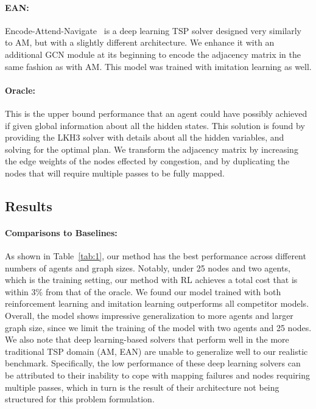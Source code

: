 \vspace{-0.1in}
\paragraph{EAN:} Encode-Attend-Navigate~\citep{ean} is a deep learning TSP solver designed very
similarly to AM, but with a slightly different architecture. We enhance it with an additional GCN
module at its beginning to encode the adjacency matrix in the same fashion as with AM. This model
was trained with imitation learning as well.

\vspace{-0.1in}
\paragraph{Oracle:} This is the upper bound performance that an agent could have possibly achieved
if given global information about all the hidden states. This solution is found by providing the
LKH3 solver with details about all the hidden variables, and solving for the optimal plan. We transform
the adjacency matrix by increasing the edge weights of the nodes effected by congestion, and by
duplicating the nodes that will require multiple passes to be fully mapped.


\subsection{Results}
\vspace{-0.1in}
\paragraph{Comparisons to Baselines:} As shown in Table~\ref{tab:1}, our method has the best
performance across different numbers of agents and graph sizes. Notably, under 25 nodes and two
agents, which is the training setting, our method with RL achieves a total cost that is within 3\%
from that of the oracle. We found our model trained with both reinforcement learning and imitation
learning outperforms all competitor models. Overall, the model shows impressive generalization to
more agents and larger graph size, since we limit the training of the model with two agents and 25
nodes. We also note that deep learning-based solvers that perform well in the more traditional TSP
domain (AM, EAN) are unable to generalize well to our realistic benchmark. Specifically, the low
performance of these deep learning solvers can be attributed to their inability to cope with mapping
failures and nodes requiring multiple passes, which in turn is the result of their architecture
not being structured for this  problem formulation.

